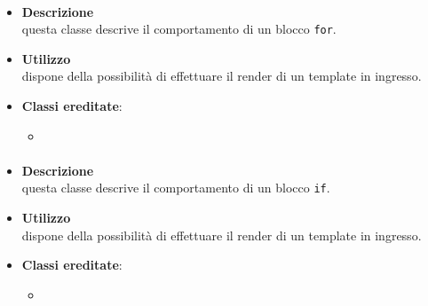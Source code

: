 \paragraph{}
\label{\nogloxy{SWEDesigner::Server::Project::ParsedFor}}
\begin{itemize}
\item \textbf{Descrizione}\\
questa classe descrive il comportamento di un blocco \texttt{for}.
\item \textbf{Utilizzo}\\
dispone della possibilità di effettuare il render di un template in ingresso.
\item \textbf{Classi ereditate}:
\begin{itemize}
\item \hyperref[\nogloxy{SWEDesigner::Server::Project::ParsedInstruction}]{}
\end{itemize}
\end{itemize}

\paragraph{}
\label{\nogloxy{SWEDesigner::Server::Project::ParsedIf}}
\begin{itemize}
\item \textbf{Descrizione}\\
questa classe descrive il comportamento di un blocco \texttt{if}.
\item \textbf{Utilizzo}\\
dispone della possibilità di effettuare il render di un template in ingresso.
\item \textbf{Classi ereditate}:
\begin{itemize}
\item \hyperref[\nogloxy{SWEDesigner::Server::Project::ParsedInstruction}]{}
\end{itemize}
\end{itemize}

